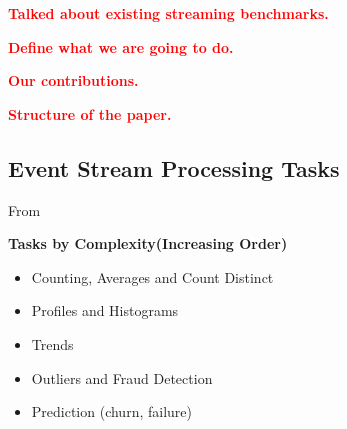 \documentclass{sig-alternate}
\begin{document}



 \textcolor{Red}{\textbf{Talked about existing streaming benchmarks.}}

 \textcolor{Red}{\textbf{Define what we are going to do.}}

 \textcolor{Red}{\textbf{Our contributions.}}

 \textcolor{Red}{\textbf{Structure of the paper.}}

 \subsection{Event Stream Processing Tasks}


From~\cite{streamdrill:presentation}

 \textbf{Tasks by Complexity(Increasing Order)}

 \begin{itemize}
  \item Counting, Averages and Count Distinct
  \item Profiles and Histograms
  \item Trends
  \item Outliers and Fraud Detection
  \item Prediction (churn, failure)
 \end{itemize}
\end{document}
